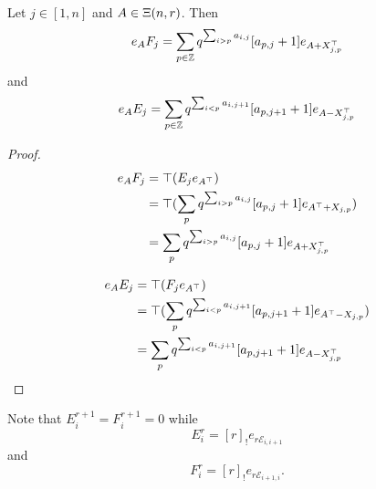 \documentclass[a4paper, 11pt]{report}
\begin{document}
\begin{corollary}
Let $j\in [1,n]$ and $A\in\Xi(n,r)$. Then
\begin{equation*}
e_A F_j = \sum_{p\in\mathbb{Z}} q^{\sum_{i>p} a_{i,j}}[a_{p,j}+1] e_{A+X_{j,p}^{\top}}
\end{equation*}
and
\begin{equation*}
e_A E_j = \sum_{p\in\mathbb{Z}} q^{\sum_{i<p} a_{i,j+1}}[a_{p,j+1}+1] e_{A-X_{j,p}^{\top}}
\end{equation*}
\end{corollary}
\begin{proof}
\begin{align*}
e_A F_j &= \top (E_j e_{A^\top})\\
&= \top ( \sum_p q^{\sum_{i>p} a_{i,j}}[a_{p,j}+1] e_{A^\top + X_{j,p}} )\\
&= \sum_p q^{\sum_{i>p} a_{i,j}} [a_{p,j}+1] e_{A+X_{j,p}^{\top}}
\end{align*}

\begin{align*}
e_A E_j &= \top (F_j e_{A^\top})\\
&= \top ( \sum_p q^{\sum_{i<p} a_{i,j+1}} [a_{p,j+1}+1] e_{A^\top - X_{j,p}} )\\
&= \sum_p q^{\sum_{i<p} a_{i,j+1}}[a_{p,j+1}+1] e_{A-X_{j,p}^{\top}}
\end{align*}
\end{proof}

Note that $E_i^{r+1}=F_i^{r+1}=0$ while
\begin{equation*}
E_i^r = [r]_! e_{r\mathcal{E}_{i,i+1}}
\end{equation*}
and
\begin{equation*}
F_i^r = [r]_! e_{r\mathcal{E}_{i+1,i}}.
\end{equation*}
\end{document}
